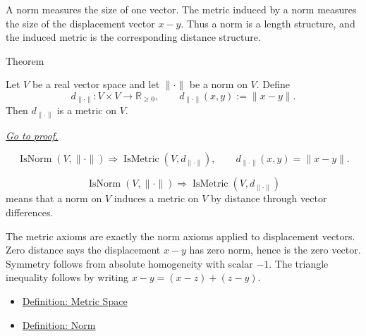 \begin{remark*}[Interpretation]
A norm measures the size of one vector.  The metric induced by a norm measures
the size of the displacement vector \(x-y\).  Thus a norm is a length
structure, and the induced metric is the corresponding distance structure.
\end{remark*}

\DefinitionalRoot

\begin{theorembox}{Theorem}
\begin{theorem}\label{thm:norm-induces-metric}
Let \(V\) be a real vector space and let \(\|\cdot\|\) be a norm on \(V\).
Define
\[
  d_{\|\cdot\|}:V\times V\to\mathbb{R}_{\geq 0},
  \qquad
  d_{\|\cdot\|}(x,y):=\|x-y\|.
\]
Then \(d_{\|\cdot\|}\) is a metric on \(V\).

\smallskip
\noindent
\hyperref[prf:norm-induces-metric]{\textit{Go to proof.}}
\end{theorem}
\end{theorembox}

\begin{remark*}
\[
\operatorname{IsNorm}(V,\|\cdot\|)
\Longrightarrow
\operatorname{IsMetric}(V,d_{\|\cdot\|}),
\qquad
d_{\|\cdot\|}(x,y)=\|x-y\|.
\]
\end{remark*}

\begin{remark*}
\[
\operatorname{IsNorm}(V,\|\cdot\|)
\Longrightarrow
\operatorname{IsMetric}(V,d_{\|\cdot\|})
\]
means that a norm on \(V\) induces a metric on \(V\) by distance through
vector differences.
\end{remark*}

\begin{remark*}[Interpretation]
The metric axioms are exactly the norm axioms applied to displacement
vectors.  Zero distance says the displacement \(x-y\) has zero norm, hence is
the zero vector.  Symmetry follows from absolute homogeneity with scalar
\(-1\).  The triangle inequality follows by writing \(x-y=(x-z)+(z-y)\).
\end{remark*}

\begin{dependencies}
\begin{itemize}
  \item \hyperref[def:metric-space]{Definition: Metric Space}
  \item \hyperref[def:norm-on-real-vector-space]{Definition: Norm}
\end{itemize}
\end{dependencies}

